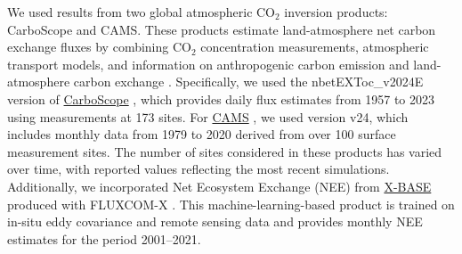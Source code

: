\documentclass[ProofPDF]{./Styles/Jnls-Template-V3}
\begin{document}
We used results from two global atmospheric CO$_2$ inversion products: CarboScope and CAMS. These products estimate land-atmosphere net carbon exchange fluxes by combining CO$_2$ concentration measurements, atmospheric transport models, and information on anthropogenic carbon emission and land-atmosphere carbon exchange \citep{Kondo2022}. Specifically, we used the nbetEXToc\_v2024E version of \hyperlink{https://www.bgc-jena.mpg.de/CarboScope/?ID=nbetEXToc_v2024E}{CarboScope} \citep{Rodenbeck2005}, which provides daily flux estimates from 1957 to 2023 using measurements at 173 sites. For \hyperlink{https://ads.atmosphere.copernicus.eu/datasets/cams-global-greenhouse-gas-inversion?tab=overview}{CAMS} \citep{Chevallier2013}, we used version v24, which includes monthly data from 1979 to 2020 derived from over 100 surface measurement sites. The number of sites considered in these products has varied over time, with reported values reflecting the most recent simulations. Additionally, we incorporated Net Ecosystem Exchange (NEE) from \hyperlink{https://meta.icos-cp.eu/collections/zfwf1Ak2I7OlziGDTX8Xl6_T}{X-BASE} produced with FLUXCOM-X \citep{Nelson2024}. This machine-learning-based product is trained on in-situ eddy covariance and remote sensing data and provides monthly NEE estimates for the period 2001–2021.



\end{document}

